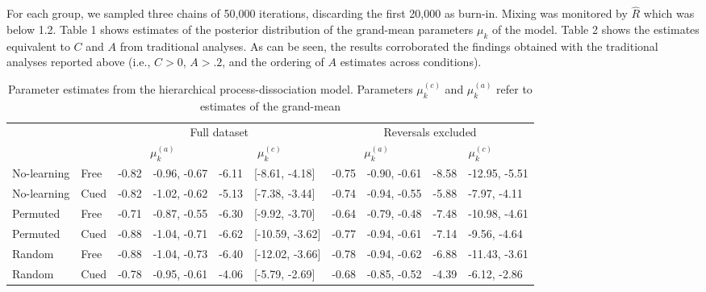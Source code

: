 \documentclass[american,floatsintext,doc]{apa6}
\begin{document}
For each group, we sampled three chains of 50,000 iterations, discarding
the first 20,000 as burn-in. Mixing was monitored by \(\hat{R}\) which
was below 1.2. Table 1 shows estimates of the posterior distribution of
the grand-mean parameters \(\mu_k\) of the model. Table 2 shows the
estimates equivalent to \(C\) and \(A\) from traditional analyses. As
can be seen, the results corroborated the findings obtained with the
traditional analyses reported above (i.e., \(C>0\), \(A>.2\), and the
ordering of \(A\) estimates across conditions).

\begin{landscape}

\begin{table}[tbp]
\centering
\caption{Parameter estimates from the hierarchical process-dissociation model. Parameters $\mu_k^{(c)}$ and $\mu_k^{(a)}$ refer to estimates of the grand-mean}
\begin{center}
\begin{threeparttable}
\begin{tabular}{llllllllll}
\toprule
\multicolumn{2}{l}{} & \multicolumn{4}{c}{Full dataset} & \multicolumn{4}{c}{Reversals excluded}\\
\multicolumn{2}{l}{} & \multicolumn{2}{c}{$\mu_k^{(a)}$} & \multicolumn{2}{c}{$\mu_k^{(c)}$} & \multicolumn{2}{c}{$\mu_k^{(a)}$} & \multicolumn{2}{c}{$\mu_k^{(c)}$}\\
\midrule
No-learning & Free & -0.82 & -0.96, -0.67 & -6.11 & [-8.61, -4.18] & -0.75 & -0.90, -0.61 & -8.58 & -12.95, -5.51\\
No-learning & Cued & -0.82 & -1.02, -0.62 & -5.13 & [-7.38, -3.44] & -0.74 & -0.94, -0.55 & -5.88 & -7.97, -4.11\\
Permuted & Free & -0.71 & -0.87, -0.55 & -6.30 & [-9.92, -3.70] & -0.64 & -0.79, -0.48 & -7.48 & -10.98, -4.61\\
Permuted & Cued & -0.88 & -1.04, -0.71 & -6.62 & [-10.59, -3.62] & -0.77 & -0.94, -0.61 & -7.14 & -9.56, -4.64\\
Random & Free & -0.88 & -1.04, -0.73 & -6.40 & [-12.02, -3.66] & -0.78 & -0.94, -0.62 & -6.88 & -11.43, -3.61\\
Random & Cued & -0.78 & -0.95, -0.61 & -4.06 & [-5.79, -2.69] & -0.68 & -0.85, -0.52 & -4.39 & -6.12, -2.86\\
\bottomrule
\end{tabular}
\end{threeparttable}
\end{center}
\end{table}

\end{landscape}
\end{document}
